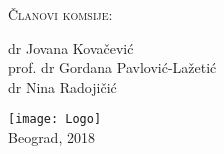 \documentclass[
11pt, %
serbian,
singlespacing, %
headsepline, %
]{MastersDoctoralThesis} %
\begin{document}
\begin{titlepage}
\begin{center}
{\scshape\LARGE Članovi komsije:\par}\vspace{0.2cm} %
dr Jovana Kovačević \\
prof. dr Gordana Pavlović-Lažetić  \\
dr Nina Radojičić \\

 
\vfill

\vspace{1cm}
\texttt{[image: Logo]}\\ %
\vspace{0.5cm}
{\large Beograd, 2018}\\ %
 
\vfill
\end{center}
\end{titlepage}



%
%  
%  
%
\end{document}
